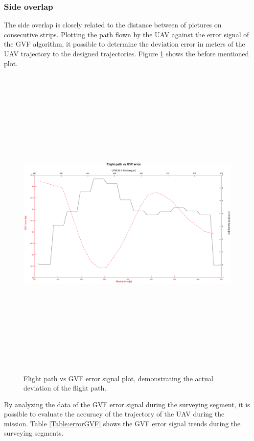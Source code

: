 \subsubsection{Side overlap}
The side overlap is closely related to the distance between of pictures on consecutive strips. Plotting  the path flown by the UAV against the error signal of the GVF algorithm, it possible to determine the deviation error in meters of the UAV trajectory to the designed trajectories. Figure \ref{fig:errorsignalGVF} shows the before mentioned plot.
\begin{figure}[H]
\centering
\includegraphics[width=\textwidth,height=16cm]{imagenes/StripvsGVF.eps}
\caption{Flight path vs GVF error signal plot, demonstrating the actual deviation of the flight path.}
\label{fig:errorsignalGVF}
\end{figure}
By analyzing the data of the GVF error signal during the surveying segment, it is possible to evaluate the accuracy of the trajectory of the UAV during the mission. Table \ref{Table:errorGVF} shows the GVF error signal trends during the surveying segments.


